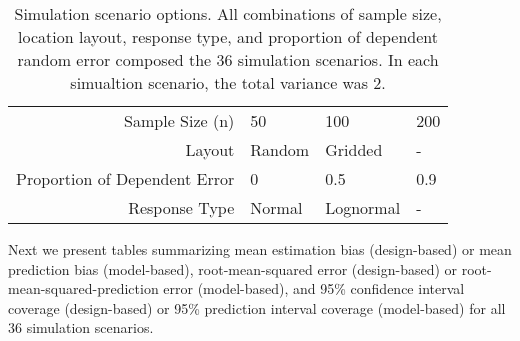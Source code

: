 \documentclass[]{elsarticle} %
\begin{document}
\begin{table}[ht]
\centering
\begin{tabular}{r|lll}
   \hline
Sample Size (n) & 50 & 100 & 200 \\ 
  Layout & Random & Gridded & - \\ 
  Proportion of Dependent Error & 0 & 0.5 & 0.9 \\ 
  Response Type & Normal & Lognormal & - \\ 
   \hline
\end{tabular}
\caption{\label{tab:parmtab} Simulation scenario options. All combinations of sample size, location layout, response type, and proportion of dependent random error composed the 36 simulation scenarios. In each simualtion scenario, the total variance was 2.} 
\end{table}

Next we present tables summarizing mean estimation bias (design-based)
or mean prediction bias (model-based), root-mean-squared error
(design-based) or root-mean-squared-prediction error (model-based), and
95\% confidence interval coverage (design-based) or 95\% prediction
interval coverage (model-based) for all 36 simulation scenarios.
\end{document}

